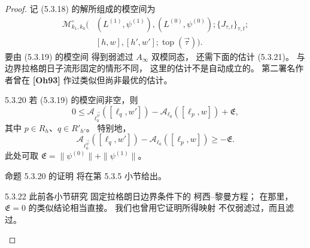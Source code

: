 \begin{proof}
记 (5.3.18) 的解所组成的模空间为
\begin{equation}
\begin{aligned}
\mathcal M^\circ_{k_1,k_0}\bigl(
 &(L^{(1)},\psi^{(1)}),
 (L^{(0)},\psi^{(0)});
 \{J_{\tau,t}\}_{\tau,t};
\\[-1mm]
 &[h,w],[h',w'];\operatorname{top}(\vec\tau)
\bigr).
\end{aligned}
\tag{5.3.19}\label{eq:5-3-19}
\end{equation}
要由 (5.3.19) 的模空间
得到弱滤过 $A_\infty$ 双模同态，
还需下面的估计 (5.3.21)。
与边界拉格朗日子流形固定的情形不同，
这里的估计不是自动成立的。
第二署名作者曾在 \textbf{[Oh93]}
作过类似但尚非最优的估计。

\begin{proposition}{5.3.20}\label{prop:5-3-20}
若 (5.3.19) 的模空间非空，则
\begin{equation}
0\le
\mathcal A_{\ell_0^{\vec\psi}}
([\ell_q,w'])
-\mathcal A_{\ell_0}([\ell_p,w])
+\mathfrak E,
\tag{5.3.21.1}\label{eq:5-3-21-1}
\end{equation}
其中 $p\in R_h$、$q\in R'_{h'}$。
特别地，
\begin{equation}
\mathcal A_{\ell_0^{\vec\psi}}
([\ell_q,w'])
-\mathcal A_{\ell_0}([\ell_p,w])
\ge-\mathfrak E.
\tag{5.3.21.2}\label{eq:5-3-21-2}
\end{equation}
此处可取
$\mathfrak E=
\|\psi^{(0)}\|+\|\psi^{(1)}\|$。
\end{proposition}
命题 5.3.20 的证明
将在第 5.3.5 小节给出。

\begin{remark}{5.3.22}\label{rem:5-3-22}
此前各小节研究
固定拉格朗日边界条件下的
柯西--黎曼方程；
在那里，$\mathfrak E=0$
的类似结论相当直接。
我们也曾用它证明所得映射
不仅弱滤过，而且滤过。
\end{remark}


\end{proof}
